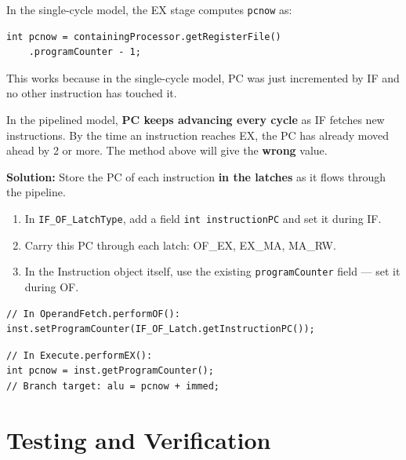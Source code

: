\documentclass[12pt,a4paper]{article}
\begin{document}
In the single-cycle model, the EX stage computes \texttt{pcnow} as:
\begin{lstlisting}[style=javastyle]
int pcnow = containingProcessor.getRegisterFile()
    .programCounter - 1;
\end{lstlisting}

This works because in the single-cycle model, PC was just incremented by IF and no other instruction has touched it.

\begin{warningbox}
In the pipelined model, \textbf{PC keeps advancing every cycle} as IF fetches new instructions. By the time an instruction reaches EX, the PC has already moved ahead by 2 or more. The method above will give the \textbf{wrong} value.
\end{warningbox}

\textbf{Solution:} Store the PC of each instruction \textbf{in the latches} as it flows through the pipeline.

\begin{enumerate}
    \item In \texttt{IF\_OF\_LatchType}, add a field \texttt{int instructionPC} and set it during IF.
    \item Carry this PC through each latch: OF\_EX, EX\_MA, MA\_RW.
    \item In the Instruction object itself, use the existing \texttt{programCounter} field --- set it during OF.
\end{enumerate}

\begin{lstlisting}[style=javastyle, caption={Storing PC in the instruction during OF}]
// In OperandFetch.performOF():
inst.setProgramCounter(IF_OF_Latch.getInstructionPC());
\end{lstlisting}

\begin{lstlisting}[style=javastyle, caption={Using stored PC in EX for branch target}]
// In Execute.performEX():
int pcnow = inst.getProgramCounter();
// Branch target: alu = pcnow + immed;
\end{lstlisting}

\section{Testing and Verification}
\end{document}
